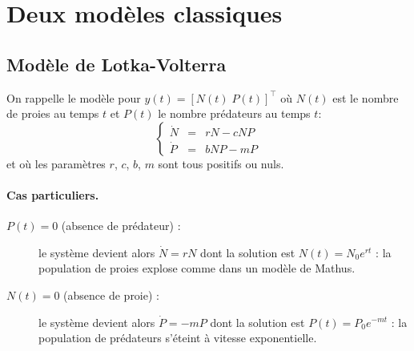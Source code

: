 \section{Deux modèles classiques}


\subsection{Modèle de Lotka-Volterra}

On rappelle le modèle pour $y(t) = [N(t) \; P(t)]^\top$ où $N(t)$ est le nombre de proies au temps $t$ et $P(t)$ le nombre prédateurs au temps $t$:
$$
\left\{ \begin{array}{rcl} 
  \dot N & = & r N - c N P \\
  \dot P & = & b N P  - m P
\end{array} \right.
$$
et où les paramètres $r$, $c$, $b$, $m$ sont tous positifs ou nuls.

\paragraph*{Cas particuliers.}
\begin{description}
  \item[$P(t) = 0 $ (absence de prédateur) :] le système devient alors $\dot N = r N$ dont la solution est $N(t) = N_0 e^{rt}$ : la population de proies explose comme dans un modèle de Mathus.
  \item[$N(t) = 0 $ (absence de proie) :] le système devient alors $\dot P = - m P$ dont la solution est $P(t) = P_0 e^{-mt}$ : la population de prédateurs s'éteint à vitesse exponentielle.
\end{description}

